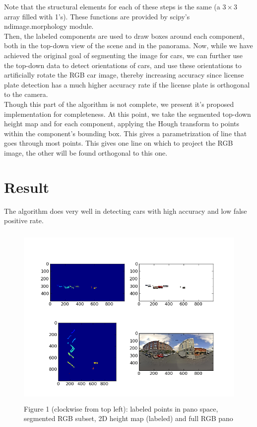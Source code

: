 \documentclass{article}
\begin{document}
Note that the structural elements for each of these steps is the same (a $3\times 3$ array filled with 1's). These 
functions are provided by scipy's ndimage.morphology module. 
\\

	Then, the labeled components are used to draw boxes around each component, both in the top-down view of the scene and in the panorama. 
Now, while we have achieved the original goal of segmenting the image for cars, we can further use the top-down data to
detect orientations of cars, and use these orientations to artificially rotate the RGB car image, thereby increasing accuracy since license plate detection has a much higher accuracy rate if the license plate is orthogonal to the camera.
\\

	Though this part of the algorithm is not complete, we present it's proposed implementation for completeness. At this point, we take the segmented top-down height map and for each component, applying the Hough transform to points within the component's bounding box. This gives a parametrization of line that goes through most points. This gives one line on which to project the RGB image, the other will be found orthogonal to this one. 

\section{Result}
The algorithm does very well in detecting cars with high accuracy and low false positive rate. 

\begin{figure}[htbp]
  \begin{center}
    \includegraphics[height=9cm, width=12cm]{./object_detect.png}
  \end{center}
  \caption{Figure 1 (clockwise from top left): labeled points in pano space, segmented RGB subset, 2D height map (labeled) and full RGB pano}
\end{figure} 
\end{document}
